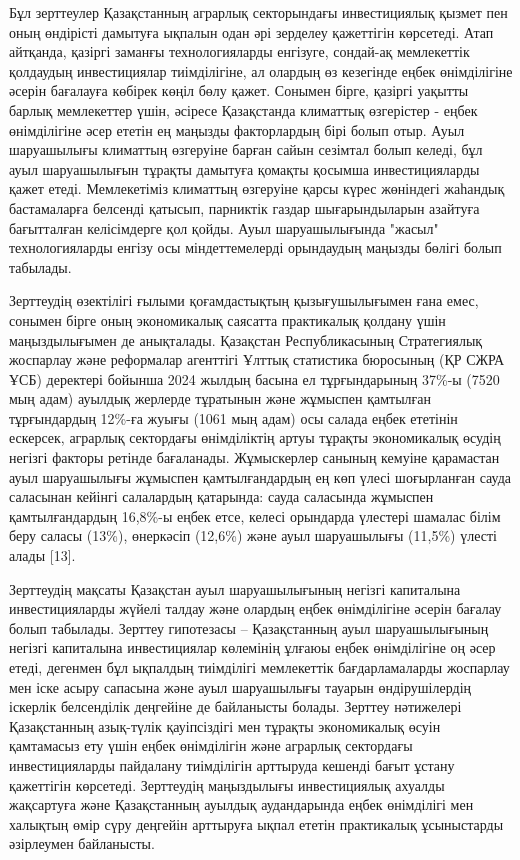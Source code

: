 {{Бұл зерттеулер Қазақстанның аграрлық секторындағы инвестициялық қызмет
пен оның өндірісті дамытуға ықпалын одан әрі зерделеу қажеттігін
көрсетеді. Атап айтқанда, қазіргі заманғы технологияларды енгізуге,
сондай-ақ мемлекеттік қолдаудың инвестициялар тиімділігіне, ал олардың
өз кезегінде еңбек өнімділігіне әсерін бағалауға көбірек көңіл бөлу
қажет. Сонымен бірге, қазіргі уақытты барлық мемлекеттер үшін, әсіресе
Қазақстанда климаттық өзгерістер - еңбек өнімділігіне әсер ететін ең
маңызды факторлардың бірі болып отыр. Ауыл шаруашылығы климаттың
өзгеруіне барған сайын сезімтал болып келеді, бұл ауыл шаруашылығын
тұрақты дамытуға қомақты қосымша инвестицияларды қажет етеді.
Мемлекетіміз климаттың өзгеруіне қарсы күрес жөніндегі жаһандық
бастамаларға белсенді қатысып, парниктік газдар шығарындыларын азайтуға
бағытталған келісімдерге қол қойды. Ауыл шаруашылығында "жасыл"
технологияларды енгізу осы міндеттемелерді орындаудың маңызды бөлігі
болып табылады.

Зерттеудің өзектілігі ғылыми қоғамдастықтың қызығушылығымен ғана емес,
сонымен бірге оның экономикалық саясатта практикалық қолдану үшін
маңыздылығымен де анықталады. Қазақстан Республикасының Стратегиялық
жоспарлау және реформалар агенттігі Ұлттық статистика бюросының (ҚР СЖРА
ҰСБ) деректері бойынша 2024 жылдың басына ел тұрғындарының 37\%-ы (7520
мың адам) ауылдық жерлерде тұратынын және жұмыспен қамтылған
тұрғындардың 12\%-ға жуығы (1061 мың адам) осы салада еңбек ететінін
ескерсек, аграрлық сектордағы өнімділіктің артуы тұрақты экономикалық
өсудің негізгі факторы ретінде бағаланады. Жұмыскерлер санының кемуіне
қарамастан ауыл шаруашылығы жұмыспен қамтылғандардың ең көп үлесі
шоғырланған сауда саласынан кейінгі салалардың қатарында: сауда
саласында жұмыспен қамтылғандардың 16,8\%-ы еңбек етсе, келесі орындарда
үлестері шамалас білім беру саласы (13\%), өнеркәсіп (12,6\%) және ауыл
шаруашылығы (11,5\%) үлесті алады {[}13{]}.

Зерттеудің мақсаты Қазақстан ауыл шаруашылығының негізгі капиталына
инвестицияларды жүйелі талдау және олардың еңбек өнімділігіне әсерін
бағалау болып табылады. Зерттеу гипотезасы -- Қазақстанның ауыл
шаруашылығының негізгі капиталына инвестициялар көлемінің ұлғаюы еңбек
өнімділігіне оң әсер етеді, дегенмен бұл ықпалдың тиімділігі мемлекеттік
бағдарламаларды жоспарлау мен іске асыру сапасына және ауыл шаруашылығы
тауарын өндірушілердің іскерлік белсенділік деңгейіне де байланысты
болады. Зерттеу нәтижелері Қазақстанның азық-түлік қауіпсіздігі мен
тұрақты экономикалық өсуін қамтамасыз ету үшін еңбек өнімділігін және
аграрлық сектордағы инвестицияларды пайдалану тиімділігін арттыруда
кешенді бағыт ұстану қажеттігін көрсетеді. Зерттеудің маңыздылығы
инвестициялық ахуалды жақсартуға және Қазақстанның ауылдық аудандарында
еңбек өнімділігі мен халықтың өмір сүру деңгейін арттыруға ықпал ететін
практикалық ұсыныстарды әзірлеумен байланысты.

}}
